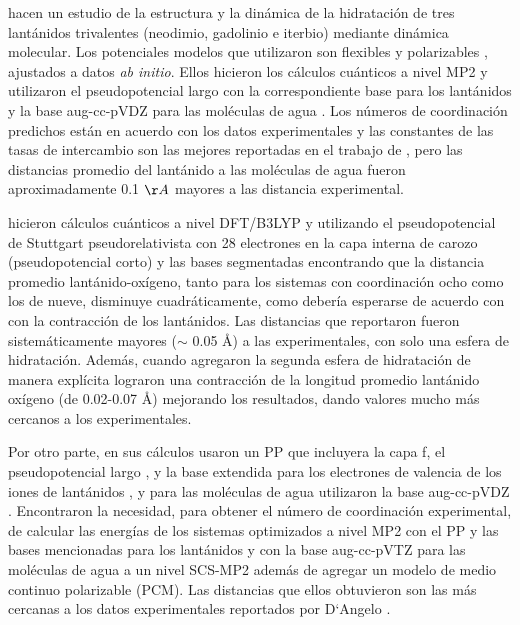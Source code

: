 \citeauthor{Vill2009} hacen un estudio de la estructura y la 
din\'amica de la hidrataci\'on de tres lant\'anidos trivalentes 
(neodimio, gadolinio e iterbio) mediante din\'amica molecular. Los 
potenciales modelos que utilizaron son flexibles y polarizables 
\citep{Sain2000}, ajustados a datos {\it ab initio}. Ellos hicieron 
los c\'alculos cu\'anticos a nivel MP2 y utilizaron el 
pseudopotencial largo con la correspondiente base \citep{Dolg1989} 
para los lant\'anidos y la base aug-cc-pVDZ para las mol\'eculas de 
agua \citep{Dunn1989}. Los n\'umeros de coordinaci\'on predichos 
est\'an en acuerdo con los datos experimentales y las constantes de 
las tasas de intercambio son las mejores reportadas en el trabajo de 
\cite{Dang2012}, pero las distancias promedio del lant\'anido a las 
mol\'eculas de agua fueron aproximadamente 0.1 $\AA$  mayores a las 
distancia experimental.


\cite{Kuta2010} hicieron c\'alculos cu\'anticos a nivel DFT/B3LYP y
utilizando el pseudopotencial de Stuttgart pseudorelativista con 28 
electrones en la capa interna de carozo (pseudopotencial corto) 
\citep{Cao2001} y las bases segmentadas %
\citep{Cao2002} encontrando que la distancia promedio 
lant\'anido-ox\'igeno, tanto para los sistemas con coordinaci\'on 
ocho como los de nueve, disminuye cuadr\'aticamente, como deber\'ia 
esperarse de acuerdo con con la contracci\'on de los lant\'anidos. 
Las distancias que reportaron fueron sistem\'aticamente mayores 
($\sim$ 0.05 \AA) a las experimentales, con solo una esfera de 
hidrataci\'on. Adem\'as, cuando agregaron la segunda esfera de 
hidrataci\'on de manera expl\'icita lograron una contracci\'on de la 
longitud promedio lant\'anido ox\'igeno (de 0.02-0.07 \AA) mejorando 
los resultados, dando valores mucho m\'as cercanos a los 
experimentales.

Por otro parte, \cite{Ciup2010} en sus c\'alculos usaron un PP 
que incluyera la capa f, el pseudopotencial largo \citep{Dolg1989}, y 
la base extendida para los electrones de valencia de los iones de 
lant\'anidos \citep{Yang2005}, %
y para las mol\'eculas de agua utilizaron la base aug-cc-pVDZ 
\citep{Dunn1989}. Encontraron la necesidad, para obtener el n\'umero 
de coordinaci\'on experimental, de calcular las energ\'ias de los 
sistemas optimizados a nivel MP2 con el PP y las bases mencionadas 
para los lant\'anidos y con la base aug-cc-pVTZ para las mol\'eculas 
de agua a un nivel SCS-MP2 \citep{Grim2003} adem\'as de agregar un 
modelo de medio continuo polarizable (PCM). Las distancias que ellos 
obtuvieron son las m\'as cercanas a los datos experimentales 
reportados por D`Angelo \citep{Dang2012}.

